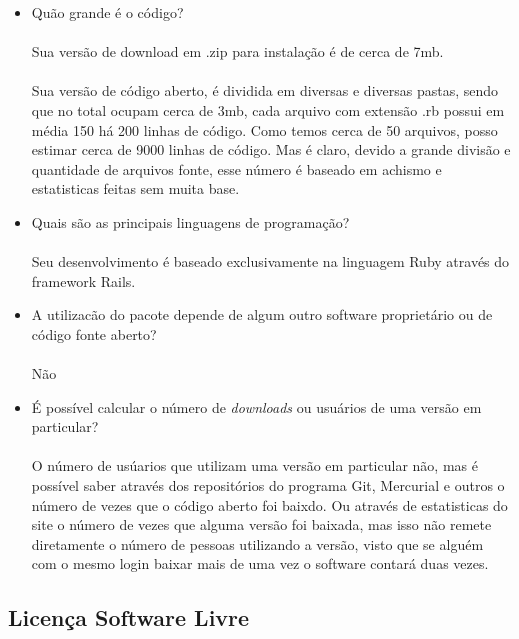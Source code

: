 \documentclass[12pt,a4paper]{article} %
\begin{document}
\begin{itemize}
\item Qu\~ao grande \'e o c\'odigo?\\
\\ Sua versão de download em .zip para instalação é de cerca de 7mb.\\
\\ Sua versão de código aberto, é dividida em diversas e diversas pastas, sendo que no total ocupam cerca de 3mb, cada arquivo com extensão .rb possui em média 150 há 200 linhas de código. Como temos cerca de 50 arquivos, posso estimar cerca de 9000 linhas de código. Mas é claro, devido a grande divisão e quantidade de arquivos fonte, esse número é baseado em achismo e estatisticas feitas sem muita base.
\item Quais s\~ao as principais linguagens de programaç\~ao?\\
\\ Seu desenvolvimento é baseado exclusivamente na linguagem Ruby através do framework Rails.
\item A utilizac\~ao do pacote depende de algum outro software propriet\'ario ou de c\'odigo fonte aberto?\\
\\ Não
\item \'E possível calcular o n\'umero de \textit{downloads} ou usu\'arios de uma versão em particular?\\
\\ O número de usúarios que utilizam uma versão em particular não, mas é possível saber através dos repositórios do programa Git, Mercurial e outros o número de vezes que o código aberto foi baixdo. Ou através de estatisticas do site o número de vezes que alguma versão foi baixada, mas isso não remete diretamente o número de pessoas utilizando a versão, visto que se alguém com o mesmo login baixar mais de uma vez o software contará duas vezes.
\end{itemize}


\subsection{Licença Software Livre}
\end{document}
